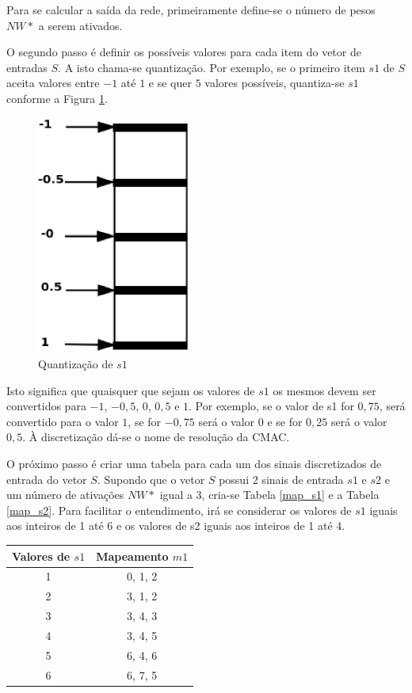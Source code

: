 Para se calcular a saída da rede, primeiramente define-se o número de pesos $NW*$ a serem ativados.

O segundo passo é definir os possíveis valores para cada item do vetor de entradas $S$. A isto chama-se quantização. Por exemplo, se o primeiro item $s1$ de $S$ aceita valores entre $-1$ até $1$ e se quer $5$ valores possíveis, quantiza-se $s1$ conforme a Figura \ref{quantizacao}.
\begin{figure}[ht]
	\centering
	\includegraphics[width=5cm]{figuras/quatizacao.eps}
	\caption{Quantização de $s1$}
	\label{quantizacao}
\end{figure}

Isto significa que quaisquer que sejam os valores de $s1$ os mesmos devem ser convertidos para $-1$, $-0,5$, $0$, $0,5$ e $1$. 
Por exemplo, se o valor de s1 for $0,75$, será convertido para o valor $1$, se for $-0,75$ será o valor $0$ e se for $0,25$ será o valor $0,5$. À discretização dá-se o nome de resolução da CMAC.

O próximo passo é criar uma tabela para cada um dos sinais discretizados de entrada do vetor $S$.
Supondo que o vetor $S$ possui 2 sinais de entrada $s1$ e $s2$ e um número de ativações $NW*$ igual a 3, cria-se Tabela \ref{map_s1} e a Tabela \ref{map_s2}. 
Para facilitar o entendimento, irá se considerar os valores de $s1$ iguais aos inteiros de 1 até 6 e os valores de s2 iguais aos inteiros de 1 até 4.
\begin{table}[htb]
	{%
		\begin{tabular}{cc}
			\toprule
			\textbf{Valores de $s1$} & \textbf{Mapeamento $m1$} \\
			\midrule
			1	&	0, 1, 2	\\
			\midrule
			2	&	3, 1, 2	\\
			\midrule
			3	&	3, 4, 3	\\
			\midrule
			4	&	3, 4, 5	\\
			\midrule
			5	&	6, 4, 6	\\
			\midrule
			6	&	6, 7, 5	\\
			\bottomrule
		\end{tabular}%
	}
	{%
	}
\end{table}

